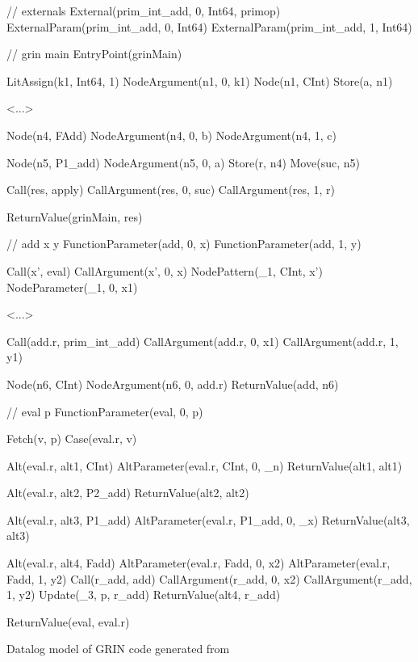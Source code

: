 \documentclass[main.tex]{subfiles}
\begin{document}
  \hspace{-0.5cm}
  \begin{codeFloat}
    \begin{minipage}{0.48\textwidth}
      \begin{haskell}
        // externals
        External(prim_int_add, 0, Int64, primop)
        ExternalParam(prim_int_add, 0, Int64)
        ExternalParam(prim_int_add, 1, Int64)

        // grin main
        EntryPoint(grinMain)

        LitAssign(k1, Int64, 1)
        NodeArgument(n1, 0, k1)
        Node(n1, CInt)
        Store(a, n1)

        <...>

        Node(n4, FAdd)
        NodeArgument(n4, 0, b)
        NodeArgument(n4, 1, c)

        Node(n5, P1_add)
        NodeArgument(n5, 0, a)
        Store(r, n4)
        Move(suc, n5)

        Call(res, apply)
        CallArgument(res, 0, suc)
        CallArgument(res, 1, r)

        ReturnValue(grinMain, res)

        // add x y
        FunctionParameter(add, 0, x)
        FunctionParameter(add, 1, y)

        Call(x', eval)
        CallArgument(x', 0, x)
        NodePattern(_1, CInt, x')
        NodeParameter(_1, 0, x1)

        <...>

        Call(add.r, prim_int_add)
        CallArgument(add.r, 0, x1)
        CallArgument(add.r, 1, y1)

        Node(n6, CInt)
        NodeArgument(n6, 0, add.r)
        ReturnValue(add, n6)


      \end{haskell}
    \end{minipage}
    \hfill
    \begin{minipage}{0.44\textwidth}
      \begin{haskellNum}{30}
      // eval p
      FunctionParameter(eval, 0, p)

      Fetch(v, p)
      Case(eval.r, v)

      Alt(eval.r, alt1, CInt)
      AltParameter(eval.r, CInt, 0, _n)
      ReturnValue(alt1, alt1)

      Alt(eval.r, alt2, P2_add)
      ReturnValue(alt2, alt2)

      Alt(eval.r, alt3, P1_add)
      AltParameter(eval.r, P1_add, 0, _x)
      ReturnValue(alt3, alt3)

      Alt(eval.r, alt4, Fadd)
      AltParameter(eval.r, Fadd, 0, x2)
      AltParameter(eval.r, Fadd, 1, y2)
      Call(r_add, add)
      CallArgument(r_add, 0, x2)
      CallArgument(r_add, 1, y2)
      Update(_3, p, r_add)
      ReturnValue(alt4, r_add)

      ReturnValue(eval, eval.r)

      \end{haskellNum}
    \end{minipage}
    \caption{Datalog model of GRIN code generated from }
    \label{code:datalog-model}

  \end{codeFloat}
\end{document}
